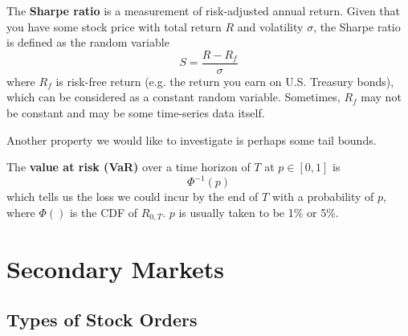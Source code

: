 \documentclass{article}
\begin{document}
    \begin{definition}
      The \textbf{Sharpe ratio} is a measurement of risk-adjusted annual return. Given that you have some stock price with total return $R$ and volatility $\sigma$, the Sharpe ratio is defined as the random variable
      \begin{equation}
        S = \frac{R - R_f}{\sigma}
      \end{equation}
      where $R_f$ is risk-free return (e.g. the return you earn on U.S. Treasury bonds), which can be considered as a constant random variable. Sometimes, $R_f$ may not be constant and may be some time-series data itself. 
    \end{definition}

    Another property we would like to investigate is perhaps some tail bounds. 

    \begin{definition}
      The \textbf{value at risk (VaR)} over a time horizon of $T$ at $p \in [0, 1]$ is 
      \begin{equation}
        \Phi^{-1}(p)
      \end{equation}
      which tells us the loss we could incur by the end of $T$ with a probability of $p$, where $\Phi()$ is the CDF of $R_{0, T}$. $p$ is usually taken to be 1\% or 5\%. 
    \end{definition}

\section{Secondary Markets}

  \subsection{Types of Stock Orders}
\end{document}
